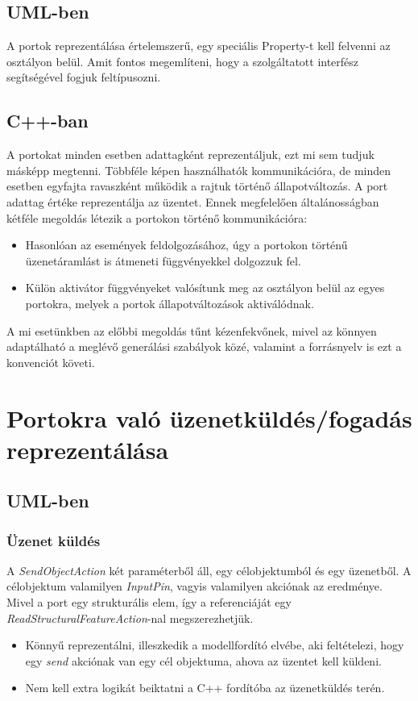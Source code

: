 \documentclass[a4paper,12pt]{report}
\begin{document}
\subsection{UML-ben}
A portok reprezentálása értelemszerű, egy speciális Property-t kell felvenni az osztályon belül. Amit fontos megemlíteni, hogy a szolgáltatott interfész segítségével fogjuk feltípusozni. 

\subsection{C++-ban}
A portokat minden esetben adattagként reprezentáljuk, ezt mi sem tudjuk másképp megtenni. Többféle képen használhatók kommunikációra, de minden esetben egyfajta ravaszként működik a rajtuk történő állapotváltozás. A port adattag értéke reprezentálja az üzentet. Ennek megfelelően általánosságban kétféle megoldás létezik a portokon történő kommunikációra:
\begin{itemize}
\item Hasonlóan az események feldolgozásához, úgy a portokon történű üzenetáramlást is átmeneti függvényekkel dolgozzuk fel.
\item Külön aktivátor függvényeket valósítunk meg az osztályon belül az egyes portokra, melyek a portok állapotváltozások aktiválódnak. 
\end{itemize}

A mi esetünkben az előbbi megoldás tűnt kézenfekvőnek, mivel az könnyen adaptálható a meglévő generálási szabályok közé, valamint a forrásnyelv is ezt a konvenciót követi. 

\section{Portokra való üzenetküldés/fogadás reprezentálása} \label{message}
\subsection{UML-ben}
\subsubsection{Üzenet küldés}
A  \textit{SendObjectAction} két paraméterből áll, egy célobjektumból és egy üzenetből.
A célobjektum valamilyen \textit{InputPin}, vagyis valamilyen akciónak az eredménye.
Mivel a port egy strukturális elem, így a referenciáját egy \textit{ReadStructuralFeatureAction}-nal megszerezhetjük. 
\begin{itemize}
\item Könnyű reprezentálni, illeszkedik a modellfordító elvébe, aki feltételezi, hogy
egy \textit{send} akciónak van egy cél objektuma, ahova az üzentet kell küldeni.
\item Nem kell extra logikát beiktatni a C++ fordítóba az üzenetküldés terén.
\end{itemize}
\end{document}
